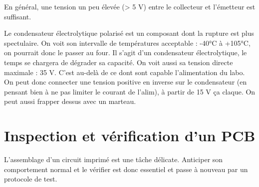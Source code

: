 \documentclass{../template/labo}
\begin{document}
{}

{
	En général, une tension un peu élevée (> 5 V) entre le collecteur et l'émetteur est suffisant.
}

{}

Le condensateur électrolytique polarisé est un composant dont la rupture est plus spectulaire.
{
	On voit son intervalle de températures acceptable : -40°C à +105°C, on pourrait donc le passer au four.
	Il s'agit d'un condensateur électrolytique, le temps se chargera de dégrader sa capacité.
	On voit aussi sa tension directe maximale : 35 V. C'est au-delà de ce dont sont capable l'alimentation du labo. On peut donc connecter une tension positive en inverse sur le condensateur (en pensant bien à ne pas limiter le courant de l'alim), à partir de 15 V ça claque.
	On peut aussi frapper dessus avec un marteau.
}


\section{Inspection et vérification d'un PCB}
L'assemblage d'un circuit imprimé est une tâche délicate.
Anticiper son comportement normal et le vérifier est donc essentiel et passe à nouveau par un protocole de test.

{}
\end{document}
